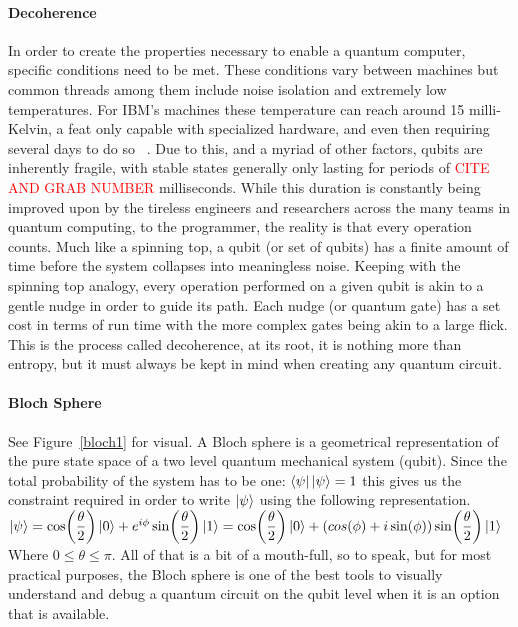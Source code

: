 \documentclass[a4paper]{article}
\begin{document}
\paragraph{Decoherence} %
In order to create the properties necessary to enable a quantum computer, specific conditions need to be met.  These conditions vary between machines but common threads among them include noise isolation and extremely low temperatures.  For IBM's machines these temperature can reach around 15 milli-Kelvin, a feat only capable with specialized hardware, and even then requiring several days to do so ~\cite{IBM_IsCold}. Due to this, and a myriad of other factors, qubits are inherently fragile, with stable states generally only lasting for periods of \textcolor{red}{CITE AND GRAB NUMBER} milliseconds. While this duration is constantly being improved upon by the tireless engineers and researchers across the many teams in quantum computing, to the programmer, the reality is that every operation counts. Much like a spinning top, a qubit (or set of qubits) has a finite amount of time before the system collapses into meaningless noise.  Keeping with the spinning top analogy, every operation performed on a given qubit is akin to a gentle nudge in order to guide its path.  Each nudge (or quantum gate) has a set cost in terms of run time with the more complex gates being akin to a large flick.  This is the process called decoherence, at its root, it is nothing more than entropy, but it must always be kept in mind when creating any quantum circuit.  


\paragraph{Bloch Sphere} %

See Figure~\ref{bloch1} for visual.  A Bloch sphere is a geometrical representation of the pure state space of a two level quantum mechanical system (qubit).\newline
\newline
Since the total probability of the system has to be one: $\left\langle{\psi}\right\vert\left\vert{\psi}\right\rangle=1$ this gives us the constraint required in order to write $\left\vert{\psi}\right\rangle$  using the following representation. \newline
$\left\vert{\psi}\right\rangle=\cos(\dfrac{\theta}{2})\left\vert{0}\right\rangle + e^{i\phi}\sin(\dfrac{\theta}{2})\left\vert{1}\right\rangle=\cos(\dfrac{\theta}{2})\left\vert{0}\right\rangle+(cos(\phi)+i\sin(\phi))\sin(\dfrac{\theta}{2})\left\vert{1}\right\rangle$ \newline
Where $0\leq\theta\leq\pi$. \newline
\newline
All of that is a bit of a mouth-full, so to speak, but for most practical purposes, the Bloch sphere is one of the best tools to visually understand and debug a quantum circuit on the qubit level when it is an option that is available.
\end{document}

